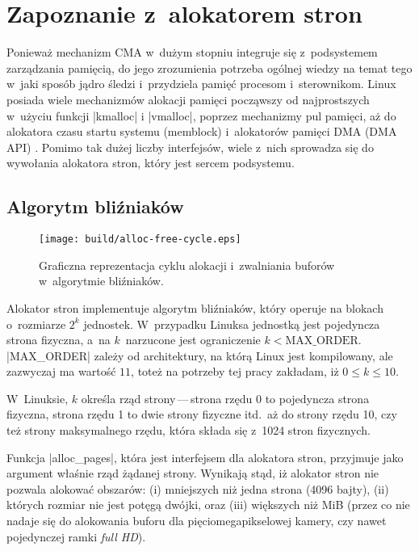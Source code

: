 \section{Zapoznanie z~alokatorem stron}

Ponieważ mechanizm CMA w~dużym stopniu integruje się z~podsystemem
zarządzania pamięcią, do jego zrozumienia potrzeba ogólnej wiedzy na
temat tego w~jaki sposób jądro śledzi i~przydziela pamięć procesom
i~sterownikom.  Linux posiada wiele mechanizmów alokacji pamięci
począwszy od najprostszych w~użyciu funkcji \code|kmalloc|
i \code|vmalloc|, poprzez mechanizmy pul pamięci, aż do alokatora
czasu startu systemu (memblock) i~alokatorów pamięci DMA (DMA API)
\autocite[rozdział 8]{bib:ldd3}.  Pomimo tak dużej liczby interfejsów,
wiele z~nich sprowadza się do wywołania alokatora stron, który jest
sercem podsystemu.

\subsection{Algorytm bliźniaków}

\begin{wrapfigure}{o}[1.5cm]{0.3\textwidth}
\begin{center}
\texttt{[image: build/alloc-free-cycle.eps]}
\end{center}
\caption[Zarządzanie pamięcią w~algorytmie bliźniaków]{Graficzna
  reprezentacja cyklu alokacji i~zwalniania buforów w~algorytmie
  bliźniaków.}
\end{wrapfigure}

Alokator stron implementuje algorytm bliźniaków, który operuje na
blokach o~rozmiarze $2^k$ jednostek.  W~przypadku Linuksa jednostką
jest pojedyncza strona fizyczna, a~na $k$~narzucone jest ograniczenie
$k < \mathrm{MAX\_ORDER}$.  \code|MAX_ORDER| zależy od architektury,
na którą Linux jest kompilowany, ale zazwyczaj ma wartość $11$, toteż
na potrzeby tej pracy zakładam, iż $0 \le k \le 10$.

W~Linuksie, $k$ określa rząd strony\,---\,strona rzędu 0 to pojedyncza
strona fizyczna, strona rzędu 1 to dwie strony fizyczne itd.\ aż do
strony rzędu 10, czy też strony maksymalnego rzędu, która składa się
z~1024 stron fizycznych.

Funkcja \code|alloc_pages|, która jest interfejsem dla alokatora
stron, przyjmuje jako argument właśnie rząd żądanej strony.  Wynikają
stąd, iż alokator stron nie pozwala alokować obszarów: (i) mniejszych
niż jedna strona (4096 bajty), (ii) których rozmiar nie jest potęgą
dwójki, oraz (iii) większych niż \unit[4]{MiB} (przez co nie nadaje
się do alokowania buforu dla pięciomegapikselowej kamery, czy nawet
pojedynczej ramki \textit{full HD}).

